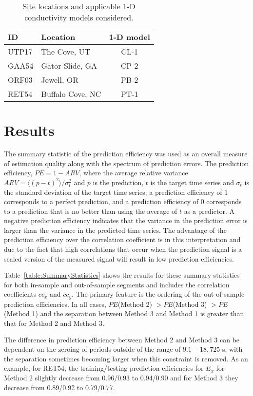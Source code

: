 \documentclass[12pt]{article}
\begin{document}
\begin{table}
\centering
\begin{tabular}{ l | l | c }
  ID    & Location & 1-D model \\
  \hline
  UTP17 & The Cove, UT & CL-1 \\
  GAA54 & Gator Slide, GA & CP-2 \\
  ORF03 & Jewell, OR & PB-2 \\
  RET54 & Buffalo Cove, NC & PT-1
\end{tabular}
\caption{Site locations and applicable 1-D conductivity models considered.}
\label{table:SiteLocations}
\end{table}

\section{Results}

The summary statistic of the prediction efficiency was used as an overall measure of estimation quality along with the spectrum of prediction errors.  The prediction efficiency, $PE = 1-ARV$, where the average relative variance $ARV = \langle(p-t)^2\rangle/\sigma_{t}^2$ and $p$ is the prediction, $t$ is the target time series and $\sigma_{t}$ is the standard deviation of the target time series; a prediction efficiency of 1 corresponds to a perfect prediction, and a prediction efficiency of 0 corresponds to a prediction that is no better than using the average of $t$ as a predictor. A negative prediction efficiency indicates that the variance in the prediction error is larger than the variance in the predicted time series. The advantage of the prediction efficiency over the correlation coefficient is in this interpretation and due to the fact that high correlations that occur when the prediction signal is a scaled version of the measured signal will result in low prediction efficiencies.

Table~\ref{table:SummaryStatistics} shows the results for these summary statistics for both in-sample and out-of-sample segments and includes the correlation coefficients $cc_x$ and $cc_y$. The primary feature is the ordering of the out-of-sample prediction efficiencies.  In all cases, 
$PE$(Method 2) $> PE$(Method 3) $> PE$(Method 1) and the separation between Method 3 and Method 1 is greater than that for Method 2 and Method 3. 

The difference in prediction efficiency between Method 2 and Method 3 can be dependent on the zeroing of periods outside of the range of $9.1-18,725$ s, with the separation sometimes becoming larger when this constraint is removed.  As an example, for RET54, the training/testing prediction efficiencies for $E_x$ for Method 2 slightly decrease from 0.96/0.93 to 0.94/0.90 and for Method 3 they decrease from 0.89/0.92 to 0.79/0.77. 
\end{document}
